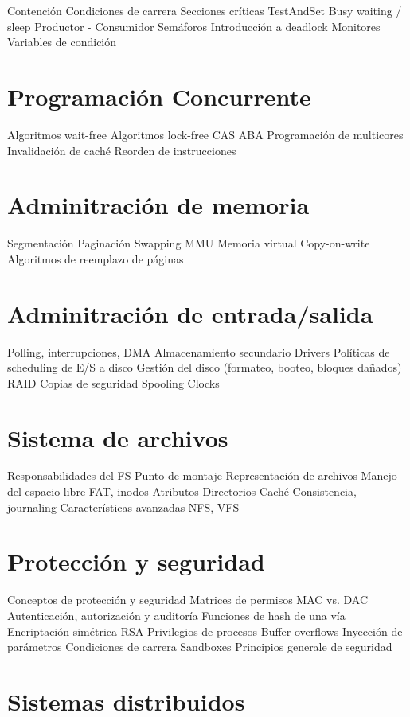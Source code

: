 Contención
Condiciones de carrera
Secciones críticas
TestAndSet
Busy waiting / sleep
Productor - Consumidor
Semáforos
Introducción a deadlock
Monitores
Variables de condición

\section{Programación Concurrente}

Algoritmos wait-free
Algoritmos lock-free
CAS
ABA
Programación de multicores
Invalidación de caché
Reorden de instrucciones

\section{Adminitración de memoria}

Segmentación
Paginación
Swapping
MMU
Memoria virtual
Copy-on-write
Algoritmos de reemplazo de páginas

\section{Adminitración de entrada/salida}

Polling, interrupciones, DMA
Almacenamiento secundario
Drivers
Políticas de scheduling de E/S a disco
Gestión del disco (formateo, booteo, bloques dañados)
RAID
Copias de seguridad
Spooling
Clocks

\section{Sistema de archivos}

Responsabilidades del FS
Punto de montaje
Representación de archivos
Manejo del espacio libre
FAT, inodos
Atributos
Directorios
Caché
Consistencia, journaling
Características avanzadas
NFS, VFS

\section{Protección y seguridad}

Conceptos de protección y seguridad
Matrices de permisos
MAC vs. DAC
Autenticación, autorización y auditoría
Funciones de hash de una vía
Encriptación simétrica
RSA
Privilegios de procesos
Buffer overflows
Inyección de parámetros
Condiciones de carrera
Sandboxes
Principios generale de seguridad

\section{Sistemas distribuidos}


